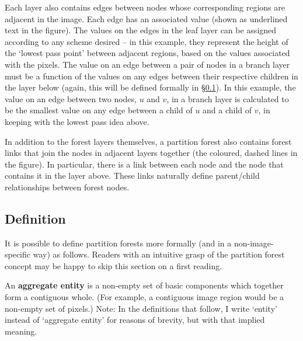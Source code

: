 Each layer also contains edges between nodes whose corresponding regions are adjacent in the image. Each edge has an associated value (shown as underlined text in the figure). The values on the edges in the leaf layer can be assigned according to any scheme desired -- in this example, they represent the height of the `lowest pass point' between adjacent regions, based on the values associated with the pixels. The value on an edge between a pair of nodes in a branch layer must be a function of the values on any edges between their respective children in the layer below (again, this will be defined formally in \S\ref{sec:ipfs-definition}). In this example, the value on an edge between two nodes, $u$ and $v$, in a branch layer is calculated to be the smallest value on any edge between a child of $u$ and a child of $v$, in keeping with the lowest pass idea above.

In addition to the forest layers themselves, a partition forest also contains forest links that join the nodes in adjacent layers together (the coloured, dashed lines in the figure). In particular, there is a link between each node and the node that contains it in the layer above. These links naturally define parent/child relationships between forest nodes.



\subsection{Definition}
\label{sec:ipfs-definition}


It is possible to define partition forests more formally (and in a non-image-specific way) as follows. Readers with an intuitive grasp of the partition forest concept may be happy to skip this section on a first reading.

\begin{definition}
An \textbf{aggregate entity} is a non-empty set of basic components which together form a contiguous whole. (For example, a contiguous image region would be a non-empty set of pixels.) Note: In the definitions that follow, I write `entity' instead of `aggregate entity' for reasons of brevity, but with that implied meaning.
\end{definition}

